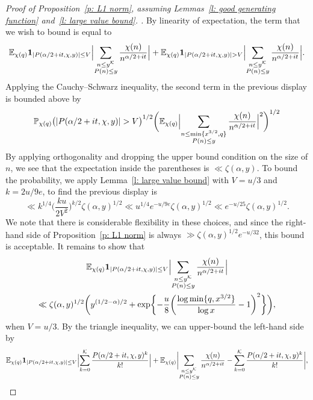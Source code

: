 \documentclass[10pt,a4paper]{amsart}
\newcommand{\E}{\mathbb{E}}
\newcommand{\p}{\mathbb{P}}
\begin{document}
\begin{proof}[Proof of Proposition~\ref{p: L1 norm}, assuming Lemmas~\ref{l: good generating function} and~\ref{l: large value bound}. ]
By linearity of expectation, the term that we wish to bound is equal to
\[
\E_{\chi (q)} \mathbf{1}_{|P (\alpha / 2 + it, \chi, y)| \leq V} \Bigl| \sum_{\substack{n \leq y^{\mathcal{K}} \\ P(n) \leq y}} \frac{\chi(n)}{n^{\alpha /2+it}} \Bigr| + \E_{\chi (q)} \mathbf{1}_{|P (\alpha / 2 + it, \chi, y)| > V} \Bigl| \sum_{\substack{n \leq y^{\mathcal{K}} \\ P(n) \leq y}} \frac{\chi(n)}{n^{\alpha /2+it}} \Bigr| .
\]
Applying the Cauchy--Schwarz inequality, the second term in the previous display is bounded above by
\[
\p_{\chi (q)} \bigl( |P (\alpha / 2 + it, \chi, y)| > V \bigr)^{1/2} \biggl( \E_{\chi (q)} \Bigl| \sum_{\substack{n \leq \min \{x^{3/2}, q\} \\ P(n) \leq y}} \frac{\chi(n)}{n^{\alpha / 2 + it}} \Bigr|^2 \biggr)^{1/2}
\]
By applying orthogonality and dropping the upper bound condition on the size of $n$, we see that the expectation inside the parentheses is $\ll \zeta(\alpha, y)$. To bound the probability, we apply Lemma~\ref{l: large value bound} with $V = u/3$ and $k = 2 u / 9e$, to find the previous display is
\[
\ll k^{1/4} \biggl( \frac{k u}{2 V^2} \biggr)^{k/2} \zeta(\alpha, y)^{1/2} \ll u^{1/4} e^{-u/9e} \zeta(\alpha, y)^{1/2} \ll e^{-u/25} \zeta(\alpha, y)^{1/2} .
\]
We note that there is considerable flexibility in these choices, and since the right-hand side of Proposition~\ref{p: L1 norm} is always $\gg \zeta (\alpha, y)^{1/2} e^{-u/32}$, this bound is acceptable. It remains to show that
\begin{multline*}
\E_{\chi (q)} \mathbf{1}_{|P (\alpha/2 + it, \chi, y)| \leq V} \Bigl| \sum_{\substack{n \leq y^{\mathcal{K}} \\ P(n) \leq y}} \frac{\chi(n)}{n^{\alpha / 2 + it}} \Bigr| \\ 
\ll \zeta (\alpha, y)^{1/2} \biggl(y^{(1/2 - \alpha)/2} + \exp \biggl\{ - \frac{u}{8} \biggl( \frac{\log \min\{ q, x^{3/2} \}}{\log x} -1 \biggr)^2 \biggr\} \biggr),
\end{multline*}
when $V = u/3$. By the triangle inequality, we can upper-bound the left-hand side by
\[
\E_{\chi(q)} \mathbf{1}_{|P (\alpha/2 + it, \chi, y)| \leq V} \Bigl| \sum_{k=0}^{\mathcal{K}} \frac{P (\alpha/2 + it, \chi, y)^k}{k!} \Bigr| + \E_{\chi (q)} \biggl| \sum_{\substack{n \leq y^{\mathcal{K}} \\ P(n) \leq y}} \frac{\chi(n)}{n^{\alpha / 2 + it}} - \sum_{k = 0}^{\mathcal{K}} \frac{P (\alpha / 2 + it, \chi, y)^{k}}{k!} \biggr|,
\]
\end{proof}
\end{document}

